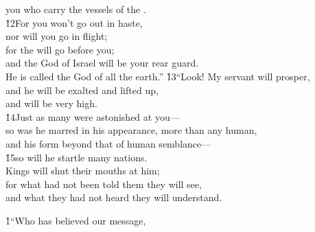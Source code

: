 \begin{poetry}
\poemlll       you who carry the vessels of the . \\
\poeml \v{12}For you won't go out in haste, \\
\poemll    nor will you go in flight; \\
\poeml for the  will go before you; \\
\poemll    and the God of Israel will be your rear guard. \\
\poemlll       He is called the God of all the earth.''
\poeml \v{13}``Look! My servant will prosper, \\
\poemll    and he will be exalted and lifted up, \\
\poemlll       and will be very high. \\
\poeml \v{14}Just as many were astonished at you--- \\
\poemll    so was he marred in his appearance, more than any human, \\
\poeml and his form beyond that of human semblance--- \\
\poeml \v{15}so will he startle many nations. \\
\poeml Kings will shut their mouths at him; \\
\poemll    for what had not been told them they will see, \\
\poemlll       and what they had not heard they will understand.
\end{poetry}

\v{1}``Who has believed our message,


